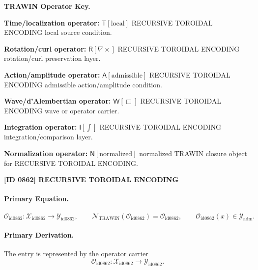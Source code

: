 \par\vspace{0.45\baselineskip}
\noindent\begin{minipage}[t]{\linewidth}
\begingroup
\small
\raggedright
\textbf{TRAWIN Operator Key.}\par
\noindent\textbf{Time/localization operator:} $\mathsf{T}\!\left[\mathrm{local}\right]$ RECURSIVE TOROIDAL ENCODING local source condition.\par
\noindent\textbf{Rotation/curl operator:} $\mathsf{R}\!\left[\nabla\times\right]$ RECURSIVE TOROIDAL ENCODING rotation/curl preservation layer.\par
\noindent\textbf{Action/amplitude operator:} $\mathsf{A}\!\left[\mathrm{admissible}\right]$ RECURSIVE TOROIDAL ENCODING admissible action/amplitude condition.\par
\noindent\textbf{Wave/d'Alembertian operator:} $\mathsf{W}\!\left[\Box\right]$ RECURSIVE TOROIDAL ENCODING wave or operator carrier.\par
\noindent\textbf{Integration operator:} $\mathsf{I}\!\left[\int\right]$ RECURSIVE TOROIDAL ENCODING integration/comparison layer.\par
\noindent\textbf{Normalization operator:} $\mathsf{N}\!\left[\mathrm{normalized}\right]$ normalized TRAWIN closure object for RECURSIVE TOROIDAL ENCODING.\par
\endgroup
\end{minipage}

\clearpage
\noindent\textbf{[ID 0862] RECURSIVE TOROIDAL ENCODING}\par
\vspace{0.35em}
\paragraph{Primary Equation.}
\[
\mathcal{O}_{\mathrm{id0862}}:\mathcal{X}_{\mathrm{id0862}}\longrightarrow \mathcal{Y}_{\mathrm{id0862}},\qquad
\mathcal{N}_{\mathrm{TRAWIN}}(\mathcal{O}_{\mathrm{id0862}})=\mathcal{O}_{\mathrm{id0862}},\qquad
\mathcal{O}_{\mathrm{id0862}}(x)\in\mathcal{Y}_{\mathrm{adm}}.
\]

\paragraph{Primary Derivation.} The entry is represented by the operator carrier\[
\mathcal{O}_{\mathrm{id0862}}:\mathcal{X}_{\mathrm{id0862}}\longrightarrow \mathcal{Y}_{\mathrm{id0862}}.
\]

